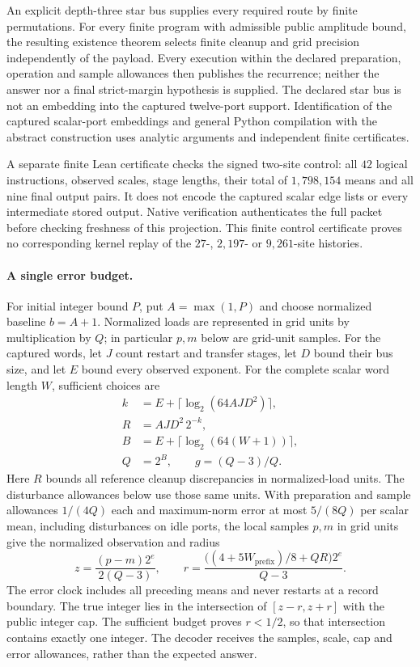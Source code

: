 An explicit depth-three star bus supplies every required route by finite
permutations. For every finite program with admissible public amplitude
bound, the resulting existence theorem selects finite cleanup and grid
precision independently of the payload. Every execution within the declared
preparation, operation and sample allowances then publishes the recurrence;
neither the answer nor a final strict-margin hypothesis is supplied. The
declared star bus is not an embedding into the captured twelve-port support.
Identification of the captured scalar-port embeddings and general Python compilation
with the abstract construction uses analytic arguments and independent
finite certificates.

A separate finite Lean certificate checks the signed two-site control:
all $42$ logical instructions, observed scales, stage lengths, their total
of $1{,}798{,}154$ means and all nine final output pairs. It does not encode
the captured scalar edge lists or every intermediate stored output. Native
verification authenticates the full packet before checking freshness of this
projection. This finite control certificate proves no corresponding kernel
replay of the $27$-, $2{,}197$- or $9{,}261$-site histories.

\paragraph{A single error budget.}
For initial integer bound $P$, put $A=\max(1,P)$ and choose normalized
baseline $b=A+1$. Normalized loads are represented in grid units by
multiplication by $Q$; in particular $p,m$ below are grid-unit samples.
For the captured words, let $J$ count restart and transfer stages, let $D$
bound their bus size, and let $E$ bound every observed exponent. For the complete scalar word length
$W$, sufficient choices are
\[
 \begin{split}
 k&=E+\lceil\log_2(64AJD^2)\rceil,\\
 R&=AJD^2\,2^{-k},\\
 B&=E+\lceil\log_2(64(W+1))\rceil,\\
 Q&=2^B,\qquad g=(Q-3)/Q.
 \end{split}
\]
Here $R$ bounds all reference cleanup discrepancies in normalized-load units.
The disturbance allowances below use those same units. With preparation and
sample allowances $1/(4Q)$ each and maximum-norm error at most $5/(8Q)$
per scalar mean, including disturbances on idle ports, the local samples
$p,m$ in grid units give the normalized observation and radius
\[
 z=\frac{(p-m)2^e}{2(Q-3)},\qquad
 r=\frac{\bigl((4+5W_{\mathrm{prefix}})/8+QR\bigr)2^e}{Q-3}.
\]
The error clock includes all preceding means and never restarts at a record
boundary. The true integer lies in the intersection of $[z-r,z+r]$ with
the public integer cap. The sufficient budget proves $r<1/2$, so that
intersection contains exactly one integer. The decoder receives the samples,
scale, cap and error allowances, rather than the expected answer.

